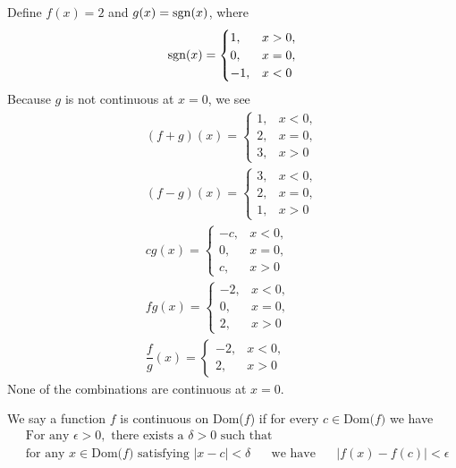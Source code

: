 \begin{example}
Define $f(x) = 2$ and $g(x) = \operatorname{sgn}(x)$, where
\begin{align*}
    \operatorname{sgn}(x) =
    \begin{cases}
    1, &x > 0,\\
    0, &x = 0,\\
    -1, &x < 0
    \end{cases}
\end{align*}
Because $g$ is not continuous at $x = 0$, we see 
\begin{align*}
    (f + g)(x) = 
    \begin{cases}
    1, &x < 0,\\
    2, &x = 0,\\
    3, &x > 0
    \end{cases}\\[2ex]
    (f - g)(x) =
    \begin{cases}
    3, &x < 0,\\
    2, &x = 0,\\
    1, &x > 0
    \end{cases}\\[2ex]
    cg(x) = 
    \begin{cases}
    -c, &x < 0,\\
    0, &x = 0,\\
    c, &x > 0
    \end{cases}\\[2ex]
    fg(x) = 
    \begin{cases}
    -2, &x < 0,\\
    0, &x = 0,\\
    2, &x > 0
    \end{cases}\\[2ex]
    \dfrac{f}{g}(x) = 
    \begin{cases}
    -2, &x < 0,\\
    2, &x > 0
    \end{cases}
\end{align*}
None of the combinations are continuous at $x = 0$.
\end{example}

\begin{definition}
We say a function $f$ is continuous on Dom($f$) if for every $c \in \text{Dom($f$)}$ we have 
\begin{align*}
    &\text{For any} \hspace{4pt} \epsilon > 0, \hspace{4pt} \text{there exists a} \hspace{4pt} \delta > 0 \hspace{4pt} \text{such that}\\[2ex]
    &\text{for any} \hspace{4pt} x \in \text{Dom($f$)} \hspace{4pt} \text{satisfying} \hspace{4pt} \lvert x - c \rvert < \delta \hspace{20pt} \text{we have} \hspace{20pt} \lvert f(x) - f(c) \rvert < \epsilon
\end{align*}
\end{definition}

